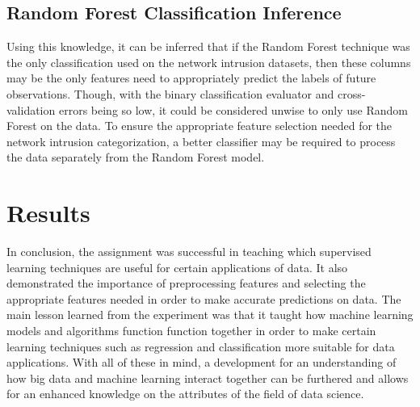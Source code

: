 \documentclass[a4paper,12pt]{IEEEtran}
\begin{document}
\subsection{Random Forest Classification Inference}
\label{class}
Using this knowledge, it can be inferred that if the Random Forest technique was the only classification used on the network intrusion datasets, then these columns may be the only features need to appropriately predict the labels of future observations. Though, with the binary classification evaluator and cross-validation errors being so low, it could be considered unwise to only use Random Forest on the data. To ensure the appropriate feature selection needed for the network intrusion categorization, a better classifier may be required to process the data separately from the Random Forest model.

\section{Results}
In conclusion, the assignment was successful in teaching which supervised learning techniques are useful for certain applications of data. It also demonstrated the importance of preprocessing features and selecting the appropriate features needed in order to make accurate predictions on data. The main lesson learned from the experiment was that it taught how machine learning models and algorithms function function together in order to make certain learning techniques such as regression and classification more suitable for data applications. With all of these in mind, a development for an understanding of how big data and machine learning interact together can be furthered and allows for an enhanced knowledge on the attributes of the field of data science.
\end{document}

